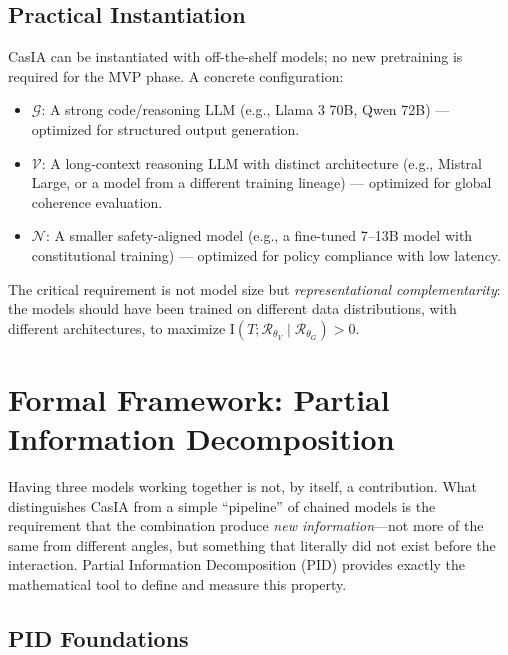 \documentclass[11pt,a4paper]{article}
\theoremstyle{remark}
\newcommand{\MI}{\mathrm{I}}
\begin{document}
\subsection{Practical Instantiation}
\label{sec:practical}

CasIA can be instantiated with off-the-shelf models; no new pretraining is required for the MVP phase. A concrete configuration:

\begin{itemize}
  \item $\mathcal{G}$: A strong code/reasoning LLM (e.g., Llama 3 70B, Qwen 72B) --- optimized for structured output generation.
  \item $\mathcal{V}$: A long-context reasoning LLM with distinct architecture (e.g., Mistral Large, or a model from a different training lineage) --- optimized for global coherence evaluation.
  \item $\mathcal{N}$: A smaller safety-aligned model (e.g., a fine-tuned 7--13B model with constitutional training) --- optimized for policy compliance with low latency.
\end{itemize}

The critical requirement is not model size but \emph{representational complementarity}: the models should have been trained on different data distributions, with different architectures, to maximize $\MI(T; \mathcal{R}_{\theta_V} \mid \mathcal{R}_{\theta_G}) > 0$.

\section{Formal Framework: Partial Information Decomposition}
\label{sec:formal}

Having three models working together is not, by itself, a contribution. What distinguishes CasIA from a simple ``pipeline'' of chained models is the requirement that the combination produce \emph{new information}---not more of the same from different angles, but something that literally did not exist before the interaction. Partial Information Decomposition (PID) provides exactly the mathematical tool to define and measure this property.

\subsection{PID Foundations}
\end{document}
